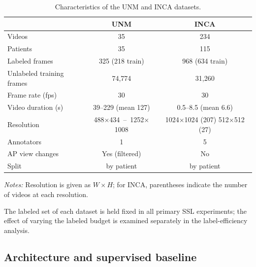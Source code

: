 \documentclass[a4paper,fleqn]{cas-dc}
\begin{document}
\begin{table}[!t]
\centering
\scriptsize
\renewcommand{\arraystretch}{1.15}
\setlength{\tabcolsep}{3pt}
\caption{Characteristics of the UNM and INCA datasets.}
\label{tab:datasets}
\begin{tabular}{@{}lcc@{}}
\toprule
 & \textbf{UNM} & \textbf{INCA} \\
\midrule
Videos                  & 35                       & 234 \\
Patients                & 35                       & 115 \\
Labeled frames          & 325 (218 train)          & 968 (634 train) \\
Unlabeled training frames & 74{,}774                 & 31{,}260 \\
Frame rate (fps)        & 30                       & 30 \\
Video duration (s)      & 39--229 (mean 127)       & 0.5--8.5 (mean 6.6) \\
Resolution              & 488${\times}$434 \,--\, 1252${\times}$1008
                        & \makecell{1024${\times}$1024 (207)\\512${\times}$512 (27)} \\
Annotators              & 1                        & 5 \\
AP view changes         & Yes (filtered)           & No \\
Split                   & by patient               & by patient \\
\bottomrule
\end{tabular}
\medskip
\noindent\begin{minipage}{\linewidth}
\footnotesize\textit{Notes:} Resolution is given as $W{\times}H$; for INCA, parentheses indicate the number of videos at each resolution.
\end{minipage}
\end{table}

The labeled set of each dataset is held fixed in all primary SSL experiments; the effect of varying the labeled budget is examined separately in the label-efficiency analysis.

\subsection{Architecture and supervised baseline}
\end{document}
